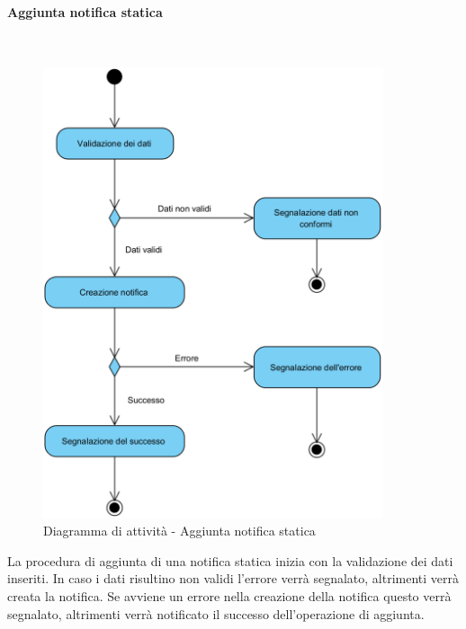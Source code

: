 \paragraph{Aggiunta notifica statica}\mbox{}\\
\nopagebreak
\begin{figure}[H]
	\centering
	\includegraphics[width=10cm]{../../documenti/SpecificaTecnica/diagrammi_img/attivita/addstaticnotification.png}
	\caption{Diagramma di attività - Aggiunta notifica statica}
\end{figure}
La procedura di aggiunta di una notifica statica inizia con la validazione dei dati inseriti. In caso i dati risultino non validi l'errore verrà segnalato, altrimenti verrà creata la notifica. Se avviene un errore nella creazione della notifica questo verrà segnalato, altrimenti verrà notificato il successo dell'operazione di aggiunta.


